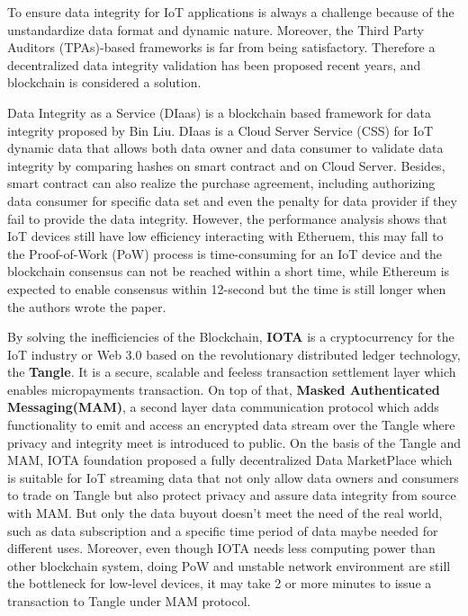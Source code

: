 \documentclass[journal,a4paper]{IEEEtran}
\begin{document}
To ensure data integrity for IoT applications is always a challenge because of the unstandardize data format and dynamic nature. Moreover, the Third Party Auditors (TPAs)-based frameworks is far from being satisfactory. Therefore a decentralized data integrity validation has been proposed recent years, and blockchain is considered a solution. 

Data Integrity as a Service (DIaas) is a blockchain based framework for data integrity proposed by Bin Liu\cite{DIaas}. DIaas is a Cloud Server Service (CSS) for IoT dynamic data that allows both data owner and data consumer to validate data integrity by comparing hashes on smart contract  and on Cloud Server. Besides, smart contract can also realize the purchase agreement, including authorizing data consumer for specific data set and even the penalty for data provider if they fail to provide the data integrity. However, the performance analysis shows that IoT devices still have low efficiency interacting with Etheruem, this may fall to the Proof-of-Work (PoW) process is time-consuming for an IoT device and the blockchain consensus can not be reached within a short time, while Ethereum is expected to enable consensus within 12-second but the time is still longer when the authors wrote the paper. 

By solving the inefficiencies of the Blockchain, \textbf{IOTA}\cite{IOTAwhitepaper} is a cryptocurrency for the IoT industry or Web 3.0 based on the revolutionary distributed ledger technology, the \textbf{Tangle}. It is a secure, scalable and feeless transaction settlement layer which enables micropayments transaction. On top of that, \textbf{Masked Authenticated Messaging(MAM)}\cite{MAM}, a second layer data communication protocol which adds functionality to emit and access an encrypted data stream over the Tangle where privacy and integrity meet is introduced to public. On the basis of the Tangle and MAM, IOTA foundation proposed a fully decentralized Data MarketPlace which is suitable for IoT streaming data that not only allow data owners and consumers to trade on Tangle but also protect privacy and assure data integrity from source with MAM. But only the data buyout doesn't meet the need of the real world, such as data subscription and a specific time period of data maybe needed for different uses. Moreover, even though IOTA needs less computing power than other blockchain system, doing PoW and unstable network environment are still the bottleneck for low-level devices, it may take 2 or more minutes to issue a transaction to Tangle under MAM protocol.
\end{document}
